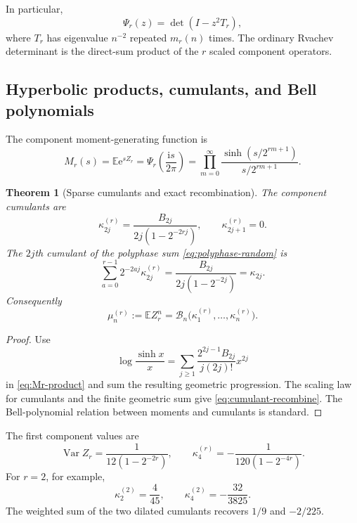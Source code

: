 \documentclass[11pt,oneside]{article}
\numberwithin{equation}{section}
\newtheorem{theorem}{Theorem}[section]
\theoremstyle{definition}
\theoremstyle{remark}
\newcommand{\E}{\mathbb E}
\newcommand{\Var}{\operatorname{Var}}
\newcommand{\e}{\mathrm e}
\newcommand{\ii}{\mathrm i}
\newcommand{\cB}{\mathcal B}
\begin{document}
In particular,
\begin{equation}
 \Psi_r(z)=\det(I-z^2T_r),                                  \label{eq:Psi-determinant}
\end{equation}
where $T_r$ has eigenvalue $n^{-2}$ repeated $m_r(n)$ times.  The ordinary
Rvachev determinant is the direct-sum product of the $r$ scaled component
operators.

\subsection{Hyperbolic products, cumulants, and Bell polynomials}

The component moment-generating function is
\begin{equation}
 M_r(s)=\E\e^{sZ_r}
 =\Psi_r\!\left(\frac{\ii s}{2\pi}\right)
 =\prod_{m=0}^{\infty}
   \frac{\sinh(s/2^{rm+1})}{s/2^{rm+1}}.                   \label{eq:Mr-product}
\end{equation}

\begin{theorem}[Sparse cumulants and exact recombination]
\label{thm:sparse-cumulants}
The component cumulants are
\begin{equation}
 \kappa_{2j}^{(r)}
 =\frac{B_{2j}}{2j(1-2^{-2rj})},
 \qquad \kappa_{2j+1}^{(r)}=0.                             \label{eq:sparse-cumulants}
\end{equation}
The $2j$th cumulant of the polyphase sum
\eqref{eq:polyphase-random} is
\begin{equation}
 \sum_{a=0}^{r-1}2^{-2aj}\kappa_{2j}^{(r)}
 =\frac{B_{2j}}{2j(1-2^{-2j})}=\kappa_{2j}.                \label{eq:cumulant-recombine}
\end{equation}
Consequently
\begin{equation}
 \mu_n^{(r)}:=\E Z_r^n
 =\cB_n\bigl(\kappa_1^{(r)},\ldots,\kappa_n^{(r)}\bigr).   \label{eq:sparse-Bell-moments}
\end{equation}
\end{theorem}

\begin{proof}
Use
\[
 \log\frac{\sinh x}{x}
 =\sum_{j\ge1}\frac{2^{2j-1}B_{2j}}{j(2j)!}x^{2j}
\]
in \eqref{eq:Mr-product} and sum the resulting geometric progression.  The
scaling law for cumulants and the finite geometric sum give
\eqref{eq:cumulant-recombine}.  The Bell-polynomial relation between moments
and cumulants is standard.
\end{proof}

The first component values are
\begin{equation}
 \Var Z_r=\frac1{12(1-2^{-2r})},
 \qquad
 \kappa_4^{(r)}=-\frac1{120(1-2^{-4r})}.                   \label{eq:sparse-first-cumulants}
\end{equation}
For $r=2$, for example,
\begin{equation}
 \kappa_2^{(2)}=\frac4{45},\qquad
 \kappa_4^{(2)}=-\frac{32}{3825}.                          \label{eq:r2-cumulants}
\end{equation}
The weighted sum of the two dilated cumulants recovers $1/9$ and $-2/225$.
\end{document}
